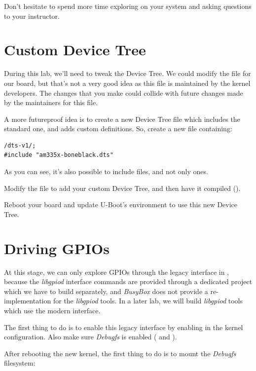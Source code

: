Don't hesitate to spend more time exploring  on your system
and asking questions to your instructor.

\section{Custom Device Tree}
During this lab, we'll need to tweak the Device Tree. We could modify the
 file for our board, but
that's not a very good idea as this file is maintained by the kernel developers.
The changes that you make could collide with future changes made by the
maintainers for this file.

A more futureproof idea is to create a new Device Tree file which
includes the standard one, and adds custom definitions. So, create a
new  file containing:

\begin{verbatim}
/dts-v1/;
#include "am335x-boneblack.dts"
\end{verbatim}

As you can see, it's also possible to include  files, and not
only  ones.

Modify the  file to add your custom
Device Tree, and then have it compiled ().

Reboot your board and update U-Boot's environment to use this new Device Tree.

\section{Driving GPIOs}

At this stage, we can only explore GPIOs through the legacy interface
in , because the {\em libgpiod} interface
commands are provided through a dedicated project which we have to
build separately, and {\em BusyBox} does not provide a
re-implementation for the {\em libgpiod} tools. In a later lab, we
will build {\em libgpiod} tools which use the modern
 interface.

The first thing to do is to enable this legacy interface by enabling
 in the kernel configuration. Also make sure
{\em Debugfs} is enabled ( and
).

After rebooting the new kernel, the first thing to do is to mount
the {\em Debugfs} filesystem:

